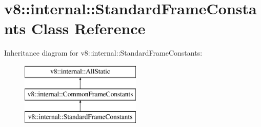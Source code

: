 \hypertarget{classv8_1_1internal_1_1_standard_frame_constants}{}\section{v8\+:\+:internal\+:\+:Standard\+Frame\+Constants Class Reference}
\label{classv8_1_1internal_1_1_standard_frame_constants}
Inheritance diagram for v8\+:\+:internal\+:\+:Standard\+Frame\+Constants\+:\begin{figure}[H]
\begin{center}
\leavevmode
\includegraphics[height=3.000000cm]{classv8_1_1internal_1_1_standard_frame_constants}
\end{center}
\end{figure}

